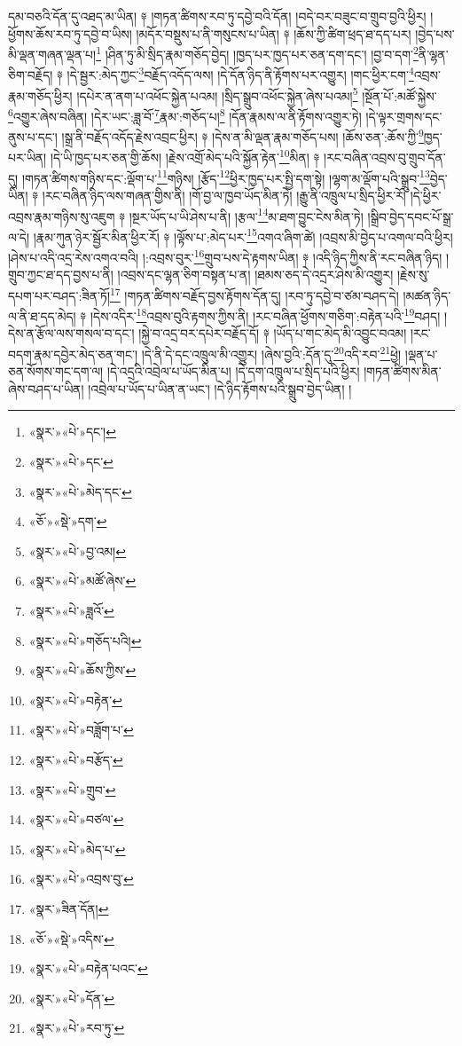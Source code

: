 དམ་བཅའི་དོན་དུ་འཐད་མ་ཡིན། ༈ །གཏན་ཚིགས་རབ་ཏུ་དབྱེ་བའི་དོན། །བདེ་བར་བཟུང་བ་གྲུབ་བྱའི་ཕྱིར། །ཕྱོགས་ཆོས་རབ་ཏུ་དབྱེ་བ་ཡིས། །མདོར་བསྡུས་པ་ནི་གསུངས་པ་ཡིན། ༈ །ཆོས་ཀྱི་ཚིག་ཕྲད་ཐ་དད་པར། །བྱེད་པས་མི་ལྡན་གཞན་ལྡན་པ།\footnote{«སྣར་»«པེ་»དང་།} །ཤིན་ཏུ་མི་སྲིད་རྣམ་གཅོད་བྱེད། །ཁྱད་པར་ཁྱད་པར་ཅན་དག་དང་། །བྱ་བ་དག་\footnote{«སྣར་»«པེ་»དང་}ནི་ལྷན་ཅིག་བརྗོད། ༈ །དེ་སྦྱར་:མེད་ཀྱང་\footnote{«སྣར་»«པེ་»མེད་དང་}བརྗོད་འདོད་ལས། །དེ་དོན་ཉིད་ནི་རྟོགས་པར་འགྱུར། །གང་ཕྱིར་ངག་\footnote{«ཅོ་»«སྡེ་»དག་}འབྲས་རྣམ་གཅོད་ཕྱིར། །དཔེར་ན་ནག་པ་འཕོང་སྐྱེན་པའམ། །སྲིད་སྒྲུབ་འཕོང་སྐྱེན་ཞེས་པའམ།\footnote{«སྣར་»«པེ་»བྱ་འམ།} །སྔོན་པོ་:མཚོ་སྐྱེས་\footnote{«སྣར་»«པེ་»མཚོ་ཞེས་}འགྱུར་ཞེས་བཞིན། །དེར་ཡང་:ཟླ་བོ་\footnote{«སྣར་»«པེ་»ཟླའོ་}རྣམ་:གཅོད་པ།\footnote{«སྣར་»«པེ་»གཅོད་པའི།} །དོན་རྣམས་ལ་ནི་རྟོགས་འགྱུར་ཏེ། །དེ་ལྟར་གྲགས་དང་ནུས་པ་དང་། །སྒྲ་ནི་བརྗོད་འདོད་རྗེས་འབྲང་ཕྱིར། ༈ །དེས་ན་མི་ལྡན་རྣམ་གཅོད་པས། །ཆོས་ཅན་:ཆོས་ཀྱི་\footnote{«སྣར་»«པེ་»ཆོས་ཀྱིས་}ཁྱད་པར་ཡིན། །དེ་ཡི་ཁྱད་པར་ཅན་གྱི་ཆོས། །རྗེས་འགྲོ་མེད་པའི་སྐྱོན་རྟེན་\footnote{«སྣར་»«པེ་»བརྟེན་}མིན། ༈ །རང་བཞིན་འབྲས་བུ་གྲུབ་དོན་དུ། །གཏན་ཚིགས་གཉིས་དང་:ལྡོག་པ་\footnote{«སྣར་»«པེ་»བཟློག་པ་}གཉིས། །རྩོད་\footnote{«སྣར་»«པེ་»བརྩོད་}ཕྱིར་ཁྱད་པར་སྤྱི་དག་སྟེ། །ལྷག་མ་ལྡོག་པའི་སྒྲུབ་\footnote{«སྣར་»«པེ་»གྲུབ་}བྱེད་ཡིན། ༈ །རང་བཞིན་ཉིད་ལས་གཞན་གྱིས་ནི། །གོ་བྱ་ལ་ཁྱབ་ཡོད་མིན་ཏེ། །རྒྱུ་ནི་འཁྲུལ་པ་སྲིད་ཕྱིར་རོ། །དེ་ཕྱིར་འབྲས་རྣམ་གཉིས་སུ་འཇུག ༈ །སྔར་ཡོད་པ་ཡི་ཤེས་པ་ནི། །རྩལ་\footnote{«སྣར་»«པེ་»བཙལ་}མ་ཐག་བྱུང་ངེས་མིན་ཏེ། །སྒྲིབ་བྱེད་དབང་པོ་སྒྲ་ལ་དེ། །རྣམ་ཀུན་ཉེར་སྦྱོར་མིན་ཕྱིར་རོ། ༈ །ལྟོས་པ་:མེད་པར་\footnote{«སྣར་»«པེ་»མེད་པ་}འགའ་ཞིག་ཚེ། །འབྲས་མི་བྱེད་པ་འགལ་བའི་ཕྱིར། །ཤེས་པ་འདི་འདྲ་རེས་འགའ་བའི། །:འབྲས་བུར་\footnote{«སྣར་»«པེ་»འབྲས་བུ་}གྲུབ་པས་དེ་རྟགས་ཡིན། ༈ །འདི་ཉིད་ཀྱིས་ནི་རང་བཞིན་ཉིད། །གྲུབ་ཀྱང་ཐ་དད་བྱས་པ་ནི། །འབྲས་དང་ལྷན་ཅིག་བསྟན་པ་ན། །ཐམས་ཅད་དེ་འདྲར་ཤེས་མི་འགྱུར། །རྗེས་སུ་དཔག་པར་བཤད་:ཟིན་ཏོ།\footnote{«སྣར་»ཟིན་དོན།} །གཏན་ཚིགས་བརྗོད་བྱས་རྟོགས་དོན་དུ། །རབ་ཏུ་དབྱེ་བ་ཙམ་བཤད་དེ། །མཚན་ཉིད་ལ་ནི་ཐ་དད་མེད། ༈ །དེས་འདིར་\footnote{«ཅོ་»«སྡེ་»འདིས་}འབྲས་བུའི་རྟགས་ཀྱིས་ནི། །རང་བཞིན་ཕྱོགས་གཅིག་:བརྟེན་པའི་\footnote{«སྣར་»«པེ་»བརྟེན་པའང་}བཤད། །དེས་ན་རྩོལ་ལས་གསལ་བ་དང་། །སྐྱེ་བ་འདྲ་བར་དཔེར་བརྗོད་དོ། ༈ །ཡོད་པ་གང་མེད་མི་འབྱུང་བའམ། །རང་བདག་རྣམ་དབྱེར་མེད་ཅན་གང་། །དེ་ནི་དེ་དང་འཁྲུལ་མི་འགྱུར། །ཞེས་བྱའི་:དོན་དུ་\footnote{«སྣར་»«པེ་»དོན་}འདི་རབ་\footnote{«སྣར་»«པེ་»རབ་ཏུ་}ཕྱེ། །ལྡན་པ་ཅན་སོགས་གང་དག་ལ། །དེ་འདྲའི་འབྲེལ་པ་ཡོད་མིན་པ། །དེ་དག་འཁྲུལ་པ་སྲིད་པའི་ཕྱིར། །གཏན་ཚིགས་མིན་ཞེས་བཤད་པ་ཡིན། །འབྲེལ་པ་ཡོད་པ་ཡིན་ན་ཡང་། །དེ་ཉིད་རྟོགས་པའི་སྒྲུབ་བྱེད་ཡིན། །
